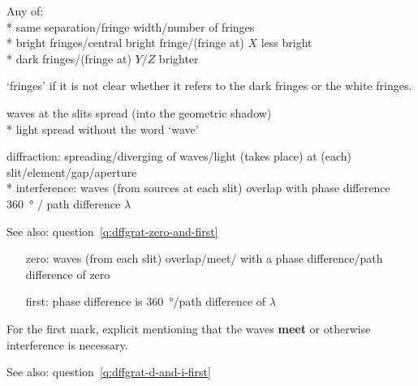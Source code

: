 \begin{question}%
  \label{q:double-slits-q2}%

  Any  of:\\*
  same separation/fringe width/number of fringes\\*
  bright fringes/central bright fringe/(fringe at) $X$ less bright\\*
  dark fringes/(fringe at) $Y$/$Z$ brighter

  \NOT `fringes' if it is not clear whether it refers to the dark fringes or the white fringes.
\end{question}

\begin{question}%

  waves at the slits  spread (into the geometric shadow) \\*
  \NOT light spread without the word `wave'
\end{question}

\begin{question}%
  \label{q:dffgrat-d-and-i-first}%

  diffraction: spreading/diverging of waves/light (takes place) at (each) slit\allowbreak/element\allowbreak/gap\allowbreak/aperture~\hfill{} \\*
  interference: waves (from  sources at each slit) overlap  with phase difference \SI{360}{\degree} / path difference $\lambda$ 

  See also: question~\ref{q:dffgrat-zero-and-first}
\end{question}

\begin{question}%
  \label{q:dffgrat-zero-and-first}%

  \begin{itemize}
    \item[zero:] waves (from each slit) overlap/meet/  with a phase difference/path difference of zero 
    \item[first:] phase difference is \SI{360}{\degree}/path difference of $\lambda$~\hfill{}
  \end{itemize}

  For the first mark, explicit mentioning that the waves \textbf{meet} or otherwise interference is necessary.

  See also: question~\ref{q:dffgrat-d-and-i-first}
\end{question}
